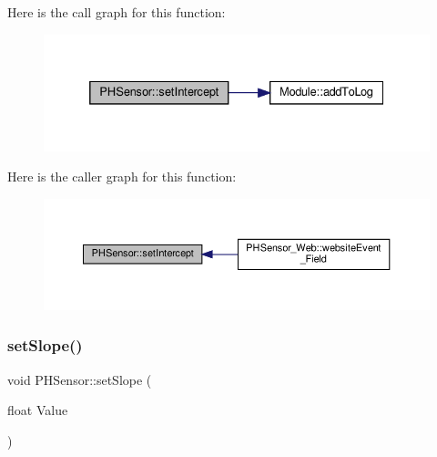 Here is the call graph for this function\+:
\nopagebreak
\begin{figure}[H]
\begin{center}
\leavevmode
\includegraphics[width=332pt]{class_p_h_sensor_a41bd303fbad556aaf714da2f0bf4a69c_cgraph}
\end{center}
\end{figure}
Here is the caller graph for this function\+:
\nopagebreak
\begin{figure}[H]
\begin{center}
\leavevmode
\includegraphics[width=350pt]{class_p_h_sensor_a41bd303fbad556aaf714da2f0bf4a69c_icgraph}
\end{center}
\end{figure}
\mbox{\label{class_p_h_sensor_ae9b41f458fafd9ae475d9bfbbb27f8d5}} 
\subsubsection{\texorpdfstring{set\+Slope()}{setSlope()}\hspace{0.1cm}{\footnotesize\ttfamily [1/2]}}
{\footnotesize\ttfamily void P\+H\+Sensor\+::set\+Slope (\begin{DoxyParamCaption}\item[{float}]{Value }\end{DoxyParamCaption})\hspace{0.3cm}{\ttfamily [protected]}}

\mbox{\label{class_p_h_sensor_ae9b41f458fafd9ae475d9bfbbb27f8d5}} 
